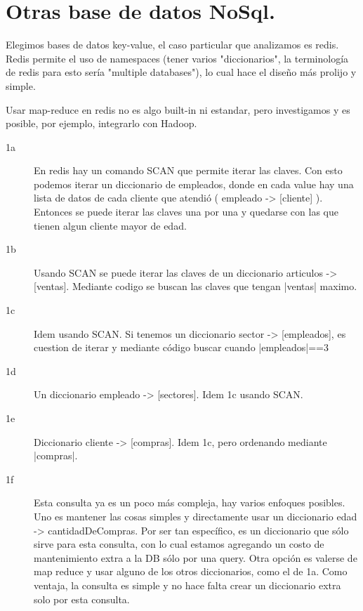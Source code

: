 \section{Otras base de datos NoSql.}


Elegimos bases de datos key-value, el caso particular que analizamos es redis.
Redis permite el uso de namespaces (tener varios "diccionarios", la terminología de redis para esto sería "multiple databases"), lo cual hace el diseño más prolijo y simple.

Usar map-reduce en redis no es algo built-in ni estandar, pero investigamos y es posible, por
    ejemplo, integrarlo con Hadoop.

\begin{description}
\item[1a] En redis hay un comando SCAN que permite iterar las claves.
        Con esto podemos iterar un diccionario de empleados, donde en cada
            value hay una lista de datos de cada cliente que atendió
            ( empleado -> [cliente] ).
        Entonces se puede iterar las claves una por una y quedarse con las que
            tienen algun cliente mayor de edad.
\item[1b]
        Usando SCAN se puede iterar las claves de un diccionario
        articulos -> [ventas]. Mediante codigo se buscan las claves que tengan
        |ventas| maximo.
\item[1c]
        Idem usando SCAN. Si tenemos un diccionario sector -> [empleados], es cuestion
            de iterar y mediante código buscar cuando |empleados|==3

\item[1d]
        Un diccionario empleado -> [sectores]. Idem 1c usando SCAN.

\item[1e]
        Diccionario cliente  -> [compras]. Idem 1c, pero ordenando mediante |compras|.

\item[1f]
        Esta consulta ya es un poco más compleja, hay varios enfoques posibles.
        Uno es mantener las cosas simples y directamente usar un diccionario
            edad -> cantidadDeCompras. Por ser tan específico, es un diccionario
            que sólo sirve para esta consulta, con lo cual estamos agregando
            un costo de mantenimiento extra a la DB sólo por una query.
        Otra opción es valerse de map reduce y usar alguno de los otros diccionarios,
            como el de 1a. Como ventaja, la consulta es simple y no hace falta crear un diccionario extra
            solo por esta consulta.


\end{description}
